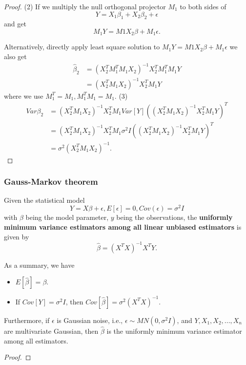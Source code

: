 \begin{refsection}
\begin{proof}
(2) If we multiply the null orthogonal projector $M_1$ to both sides of 
$$Y = X_1\beta_1 + X_2\beta_2 + \epsilon$$
and get
$$M_1Y = M1X_2 \beta + M_1\epsilon.$$

Alternatively, directly apply least square solution to $M_1Y = M1X_2 \beta + M_1\epsilon$ we also get
\begin{align*}
\hat{\beta}_2 &= (X_2^TM_1^TM_1X_2)^{-1}X_2^TM_1^TM_1Y \\
			  &= (X_2^TM_1X_2)^{-1}X_2^TM_1Y
\end{align*}
where we use $M_1^T = M_1, M^T_1M_1 = M_1.$
(3)
\begin{align*}
Var{\beta}_2 &= (X_2^TM_1X_2)^{-1}X_2^TM_1Var[Y] ((X_2^TM_1X_2)^{-1}X_2^TM_1Y)^T \\
			 &= (X_2^TM_1X_2)^{-1}X_2^TM_1\sigma^2 I ((X_2^TM_1X_2)^{-1}X_2^TM_1Y)^T \\
			 &= \sigma^2 (X_2^TM_1X_2)^{-1}.
\end{align*}
\end{proof}



\subsubsection{Gauss-Markov theorem}



\begin{theorem}\label{ch:regression-analysis:th:BestLinearUnbiasedEstimator}
	Given the statistical model
	$$Y= X\beta + \epsilon, E[\epsilon] = 0, Cov(\epsilon) = \sigma^2 I$$
	with $\beta$ being the model parameter, $y$ being the observations, the \textbf{uniformly minimum variance estimators among all linear unbiased estimators} is given by
	$$\hat{\beta} = (X^TX)^{-1}X^TY.$$
	
	As a summary, we have
	\begin{itemize}
		\item $E[\hat{\beta}] = \beta$.
		\item If $Cov[Y] = \sigma^2I$, then $Cov[\hat{\beta}] = \sigma^2(X^TX)^{-1}$.
	\end{itemize}

Furthermore, if $\epsilon$ is Gaussian noise, i.e., $\epsilon \sim MN(0, \sigma^2 I)$, and $Y,X_1,X_2,...,X_n$ are multivariate Gaussian, then $\hat{\beta}$ is the uniformly minimum variance estimator among all estimators.
\end{theorem}
\begin{proof}
	

\end{proof}
\end{refsection}
